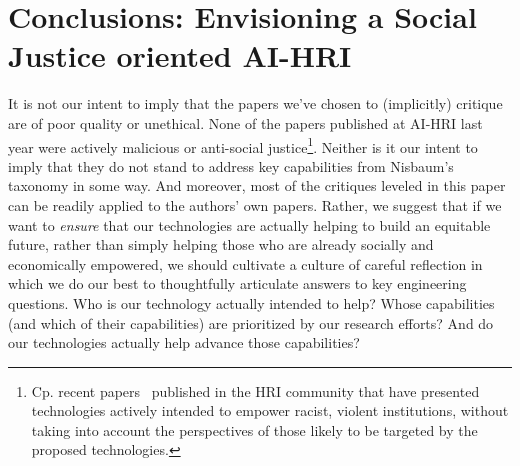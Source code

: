 \documentclass[letterpaper]{article} %
\begin{document}


\section{Conclusions: Envisioning a Social Justice oriented AI-HRI}

It is not our intent to imply that the papers we've chosen to (implicitly) critique are of poor quality or unethical.
None of the papers published at AI-HRI last year were actively malicious or anti-social justice\footnote{Cp. recent papers~\cite{bordbar2021roman} published in the HRI community that have presented technologies actively intended to empower racist, violent institutions, without taking into account the perspectives of those likely to be targeted by the proposed technologies.}. Neither is it our intent to imply that they do not stand to address key capabilities from Nisbaum's taxonomy in some way.
And moreover, most of the critiques leveled in this paper can be readily applied to the authors' own papers.
Rather, we suggest that if we want to \textit{ensure} that our technologies are actually helping to build an equitable future, rather than simply helping those who are already socially and economically empowered, we should cultivate a culture of careful reflection in which we do our best to thoughtfully articulate answers to key engineering questions. Who is our technology actually intended to help? Whose capabilities (and which of their capabilities) are prioritized by our research efforts? And do our technologies actually help advance those capabilities?
\end{document}
